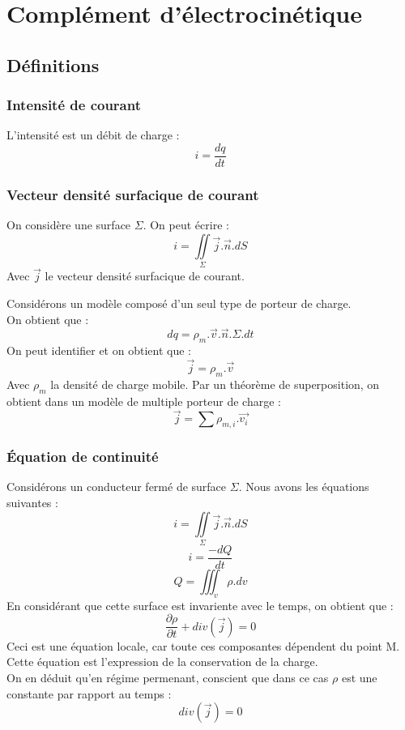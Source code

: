 \chapter{Complément d'électrocinétique}
\section{Définitions}
\subsection{Intensité de courant}
\begin{de}
L'intensité est un débit de charge : 
$$i = \dfrac{dq}{dt}$$
\end{de}
\subsection{Vecteur densité surfacique de courant}
\begin{de}
On considère une surface $\Sigma$. On peut écrire : 
$$ i = \underset{\Sigma}\iint \overrightarrow{j}.\overrightarrow{n}.dS$$
Avec $\overrightarrow{j}$ le vecteur densité surfacique de courant.
\end{de}
Considérons un modèle composé d'un seul type de porteur de charge. \\
On obtient que : 
$$dq = \rho_m.\overrightarrow{v}.\overrightarrow{n}.\Sigma.dt$$
On peut identifier et on obtient que :
$$\overrightarrow{j} = \rho_m.\overrightarrow{v}$$
Avec $\rho_m$ la densité de charge mobile. Par un théorème de superposition, on obtient dans un modèle de multiple porteur de charge : 
$$\overrightarrow{j} = \sum \rho_{m,i}.\overrightarrow{v_i}$$
\subsection{Équation de continuité}
Considérons un conducteur fermé de surface $\Sigma$. Nous avons les équations suivantes :
$$i = \underset{\Sigma}\iint \overrightarrow{j}.\overrightarrow{n}.dS$$
$$i = \dfrac{-dQ}{dt}$$
$$Q = \iiint_v \rho.dv$$
En considérant que cette surface est invariente avec le temps, on obtient que : 
$$\dfrac{\partial \rho}{\partial t} + div(\overrightarrow{j}) = 0$$
Ceci est une équation locale, car toute ces composantes dépendent du point M. Cette équation est l'expression de la conservation de la charge.\\
On en déduit qu'en régime permenant, conscient que dans ce cas $\rho$ est une constante par rapport au temps : 
$$div(\overrightarrow{j})= 0$$
